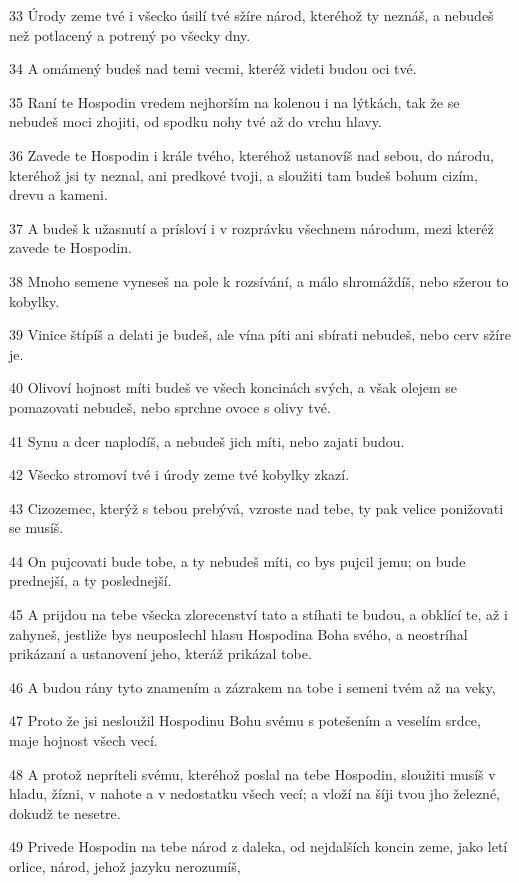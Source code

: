 \par 33 Úrody zeme tvé i všecko úsilí tvé sžíre národ, kteréhož ty neznáš, a nebudeš než potlacený a potrený po všecky dny.
\par 34 A omámený budeš nad temi vecmi, kteréž videti budou oci tvé.
\par 35 Raní te Hospodin vredem nejhorším na kolenou i na lýtkách, tak že se nebudeš moci zhojiti, od spodku nohy tvé až do vrchu hlavy.
\par 36 Zavede te Hospodin i krále tvého, kteréhož ustanovíš nad sebou, do národu, kteréhož jsi ty neznal, ani predkové tvoji, a sloužiti tam budeš bohum cizím, drevu a kameni.
\par 37 A budeš k užasnutí a prísloví i v rozprávku všechnem národum, mezi kteréž zavede te Hospodin.
\par 38 Mnoho semene vyneseš na pole k rozsívání, a málo shromáždíš, nebo sžerou to kobylky.
\par 39 Vinice štípíš a delati je budeš, ale vína píti ani sbírati nebudeš, nebo cerv sžíre je.
\par 40 Olivoví hojnost míti budeš ve všech koncinách svých, a však olejem se pomazovati nebudeš, nebo sprchne ovoce s olivy tvé.
\par 41 Synu a dcer naplodíš, a nebudeš jich míti, nebo zajati budou.
\par 42 Všecko stromoví tvé i úrody zeme tvé kobylky zkazí.
\par 43 Cizozemec, kterýž s tebou prebývá, vzroste nad tebe, ty pak velice ponižovati se musíš.
\par 44 On pujcovati bude tobe, a ty nebudeš míti, co bys pujcil jemu; on bude prednejší, a ty poslednejší.
\par 45 A prijdou na tebe všecka zlorecenství tato a stíhati te budou, a obklící te, až i zahyneš, jestliže bys neuposlechl hlasu Hospodina Boha svého, a neostríhal prikázaní a ustanovení jeho, kteráž prikázal tobe.
\par 46 A budou rány tyto znamením a zázrakem na tobe i semeni tvém až na veky,
\par 47 Proto že jsi nesloužil Hospodinu Bohu svému s potešením a veselím srdce, maje hojnost všech vecí.
\par 48 A protož nepríteli svému, kteréhož poslal na tebe Hospodin, sloužiti musíš v hladu, žízni, v nahote a v nedostatku všech vecí; a vloží na šíji tvou jho železné, dokudž te nesetre.
\par 49 Privede Hospodin na tebe národ z daleka, od nejdalších koncin zeme, jako letí orlice, národ, jehož jazyku nerozumíš,
